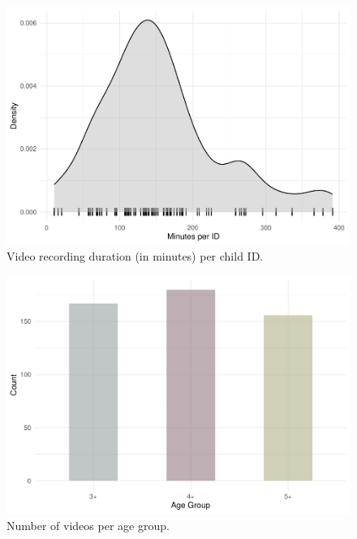 \documentclass[
  man,floatsintext]{apa6}
\begin{document}
\begin{figure}
\centering
\includegraphics{ChildLens_paper_files/figure-latex/quantex-minutes-per-child-1.pdf}
\caption{\label{fig:quantex-minutes-per-child}Video recording duration (in minutes) per child ID.}
\end{figure}

\begin{figure}
\centering
\includegraphics{ChildLens_paper_files/figure-latex/quantex-age-distribution-1.pdf}
\caption{\label{fig:quantex-age-distribution}Number of videos per age group.}
\end{figure}
\end{document}
